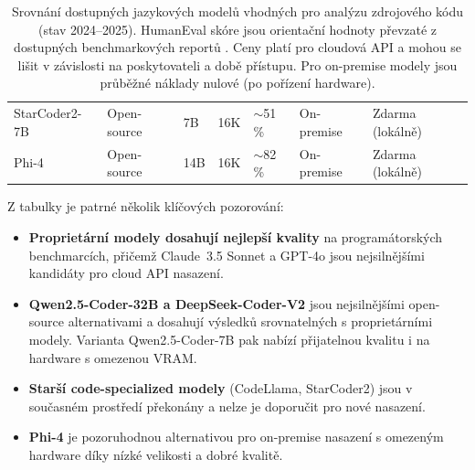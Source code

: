 \begin{table}[H]
{\begin{tabular}{lllllll}
            StarCoder2-7B            & Open-source     & 7B                & 16K              & $\sim$51 \%        & On-premise          & Zdarma (lokálně) \\
            Phi-4                    & Open-source     & 14B               & 16K              & $\sim$82 \%        & On-premise          & Zdarma (lokálně) \\
            \bottomrule
        \end{tabular}
    }
    \caption{Srovnání dostupných jazykových modelů vhodných pro analýzu zdrojového kódu (stav 2024--2025).
    HumanEval skóre jsou orientační hodnoty převzaté z dostupných benchmarkových reportů \cite{humaneval2021, livecodebench2024}.
    Ceny platí pro cloudová API a mohou se lišit v závislosti na poskytovateli a době přístupu.
    Pro on-premise modely jsou průběžné náklady nulové (po pořízení hardware).}
    \label{tab:models-comparison}
\end{table}

Z tabulky je patrné několik klíčových pozorování:

\begin{itemize}
    \item \textbf{Proprietární modely dosahují nejlepší kvality} na programátorských benchmarcích, přičemž Claude~3.5 Sonnet a GPT-4o jsou nejsilnějšími kandidáty pro cloud API nasazení.

    \item \textbf{Qwen2.5-Coder-32B a DeepSeek-Coder-V2} jsou nejsilnějšími open-source alternativami a dosahují výsledků srovnatelných s proprietárními modely.
    Varianta Qwen2.5-Coder-7B pak nabízí přijatelnou kvalitu i na hardware s omezenou VRAM.

    \item \textbf{Starší code-specialized modely} (CodeLlama, StarCoder2) jsou v současném prostředí překonány a nelze je doporučit pro nové nasazení.

    \item \textbf{Phi-4} je pozoruhodnou alternativou pro on-premise nasazení s omezeným hardware díky nízké velikosti a dobré kvalitě.
\end{itemize}

\endinput
